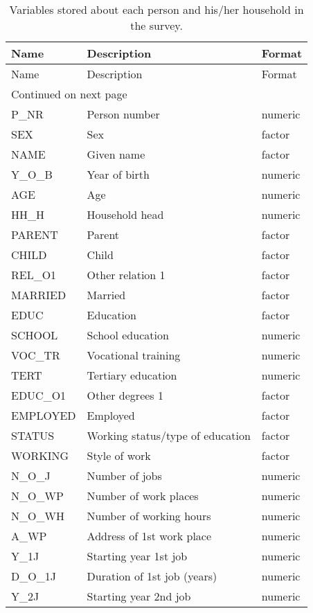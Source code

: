 \begin{longtable}{lll}
\caption{Variables stored about each person and his/her household in the survey.} \\ 
\hline
Name & Description & Format \\ 
\hline
\endfirsthead
\hline
Name & Description & Format\\
\hline
\endhead
\hline
\multicolumn{3}{l}{\footnotesize Continued on next page}
\endfoot
\endlastfoot
 \hline
HH\_NR & Household number & numeric \\ 
  P\_NR & Person number & numeric \\ 
  SEX & Sex & factor \\ 
  NAME & Given name & factor \\ 
  Y\_O\_B & Year of birth & numeric \\ 
  AGE & Age & numeric \\ 
  HH\_H & Household head & numeric \\ 
  PARENT & Parent & factor \\ 
  CHILD & Child & factor \\ 
  REL\_O1 & Other relation 1 & factor \\ 
  MARRIED & Married & factor \\ 
  EDUC & Education & factor \\ 
  SCHOOL & School education & numeric \\ 
  VOC\_TR & Vocational training & numeric \\ 
  TERT & Tertiary education & numeric \\ 
  EDUC\_O1 & Other degrees 1 & factor \\ 
  EMPLOYED & Employed & factor \\ 
  STATUS & Working status/type of education & factor \\ 
  WORKING & Style of work & factor \\ 
  N\_O\_J & Number of jobs & numeric \\ 
  N\_O\_WP & Number of work places & numeric \\ 
  N\_O\_WH & Number of working hours & numeric \\ 
  A\_WP & Address of 1st work place & numeric \\ 
  Y\_1J & Starting year 1st job & numeric \\ 
  D\_O\_1J & Duration of 1st job (years) & numeric \\ 
  Y\_2J & Starting year 2nd job & numeric \\ 

\end{longtable}
